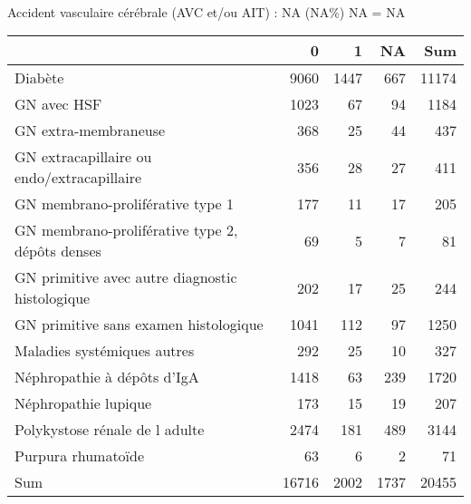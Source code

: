 \documentclass[11pt,a4paper]{article}\usepackage[]{graphicx}\usepackage[]{color}
\begin{document}
~\\

Accident vasculaire cérébrale (AVC et/ou AIT) : NA (NA\%) NA = NA



\begin{table}[H]
\centering
\begin{tabular}{lrrrr}
  \hline
 & 0 & 1 & NA & Sum \\ 
  \hline
Diabète & 9060 & 1447 & 667 & 11174 \\ 
  GN avec HSF & 1023 & 67 & 94 & 1184 \\ 
  GN extra-membraneuse & 368 & 25 & 44 & 437 \\ 
  GN extracapillaire ou endo/extracapillaire & 356 & 28 & 27 & 411 \\ 
  GN membrano-proliférative type 1 & 177 & 11 & 17 & 205 \\ 
  GN membrano-proliférative type 2, dépôts denses & 69 & 5 & 7 & 81 \\ 
  GN primitive avec autre diagnostic histologique & 202 & 17 & 25 & 244 \\ 
  GN primitive sans examen histologique & 1041 & 112 & 97 & 1250 \\ 
  Maladies systémiques autres & 292 & 25 & 10 & 327 \\ 
  Néphropathie à dépôts d'IgA & 1418 & 63 & 239 & 1720 \\ 
  Néphropathie lupique & 173 & 15 & 19 & 207 \\ 
  Polykystose rénale de l adulte & 2474 & 181 & 489 & 3144 \\ 
  Purpura rhumatoïde & 63 & 6 & 2 & 71 \\ 
  Sum & 16716 & 2002 & 1737 & 20455 \\ 
   \hline
\end{tabular}
\end{table}
\end{document}
